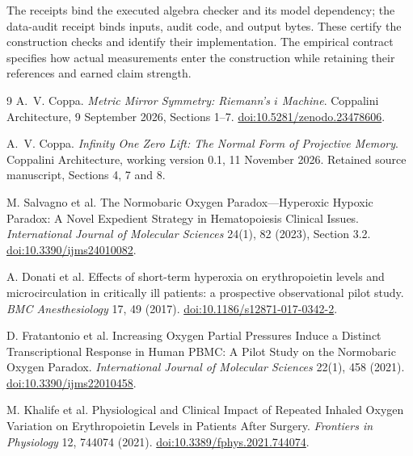 \documentclass[11pt]{article}
\begin{document}
The receipts bind the executed algebra checker and its model dependency;
the data-audit receipt binds inputs, audit code, and output bytes.
These certify the construction checks and identify their implementation.
The empirical contract specifies how actual measurements enter the
construction while retaining their references and earned claim strength.

\begin{thebibliography}{9}
\footnotesize
\setlength{\itemsep}{1pt}
\setlength{\parskip}{0pt}
\setlength{\parsep}{0pt}
A.~V. Coppa. \emph{Metric Mirror Symmetry: Riemann's \(i\) Machine}.
Coppalini Architecture, 9 September 2026, Sections 1--7.
\href{https://doi.org/10.5281/zenodo.23478606}{doi:10.5281/zenodo.23478606}.

A.~V. Coppa. \emph{Infinity One Zero Lift: The Normal Form of Projective Memory}.
Coppalini Architecture, working version 0.1, 11 November 2026.
Retained source manuscript, Sections 4, 7 and 8.

M. Salvagno et al.
The Normobaric Oxygen Paradox---Hyperoxic Hypoxic Paradox:
A Novel Expedient Strategy in Hematopoiesis Clinical Issues.
\emph{International Journal of Molecular Sciences} 24(1), 82 (2023),
Section 3.2.
\href{https://doi.org/10.3390/ijms24010082}{doi:10.3390/ijms24010082}.

A. Donati et al.
Effects of short-term hyperoxia on erythropoietin levels and microcirculation
in critically ill patients: a prospective observational pilot study.
\emph{BMC Anesthesiology} 17, 49 (2017).
\href{https://doi.org/10.1186/s12871-017-0342-2}{doi:10.1186/s12871-017-0342-2}.

D. Fratantonio et al.
Increasing Oxygen Partial Pressures Induce a Distinct Transcriptional
Response in Human PBMC: A Pilot Study on the Normobaric Oxygen Paradox.
\emph{International Journal of Molecular Sciences} 22(1), 458 (2021).
\href{https://doi.org/10.3390/ijms22010458}{doi:10.3390/ijms22010458}.

M. Khalife et al.
Physiological and Clinical Impact of Repeated Inhaled Oxygen Variation
on Erythropoietin Levels in Patients After Surgery.
\emph{Frontiers in Physiology} 12, 744074 (2021).
\href{https://doi.org/10.3389/fphys.2021.744074}{doi:10.3389/fphys.2021.744074}.
\end{thebibliography}
\end{document}
